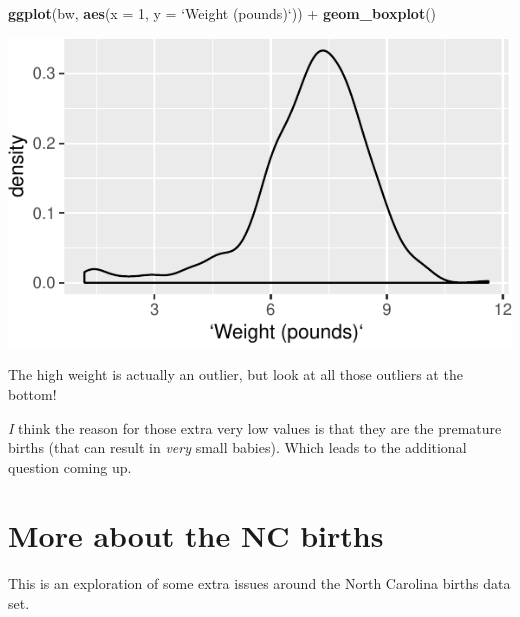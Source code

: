 \documentclass[]{tufte-book}
\newenvironment{Shaded}{}{}
\newcommand{\DataTypeTok}[1]{\textcolor[rgb]{0.56,0.13,0.00}{#1}}
\newcommand{\DecValTok}[1]{\textcolor[rgb]{0.25,0.63,0.44}{#1}}
\newcommand{\KeywordTok}[1]{\textcolor[rgb]{0.00,0.44,0.13}{\textbf{#1}}}
\newcommand{\NormalTok}[1]{#1}
\newcommand{\OperatorTok}[1]{\textcolor[rgb]{0.40,0.40,0.40}{#1}}
\newcommand{\StringTok}[1]{\textcolor[rgb]{0.25,0.44,0.63}{#1}}
\theoremstyle{definition}
\theoremstyle{definition}
\theoremstyle{definition}
\theoremstyle{remark}
\begin{document}
\begin{Shaded}
\begin{Highlighting}[]
\KeywordTok{ggplot}\NormalTok{(bw, }\KeywordTok{aes}\NormalTok{(}\DataTypeTok{x =} \DecValTok{1}\NormalTok{, }\DataTypeTok{y =} \StringTok{`}\DataTypeTok{Weight (pounds)}\StringTok{`}\NormalTok{)) }\OperatorTok{+}\StringTok{ }
\StringTok{    }\KeywordTok{geom_boxplot}\NormalTok{()}
\end{Highlighting}
\end{Shaded}

\includegraphics{03-data-summaries_files/figure-latex/unnamed-chunk-16-1}

The high weight is actually an outlier, but look at all those outliers
at the bottom!

\emph{I} think the reason for those extra very low values is that they
are the premature births (that can result in \emph{very} small babies).
Which leads to the additional question coming up.

\hypertarget{more-about-the-nc-births}{%
\section{More about the NC births}\label{more-about-the-nc-births}}

This is an exploration of some extra issues around the North Carolina
births data set.
\end{document}

